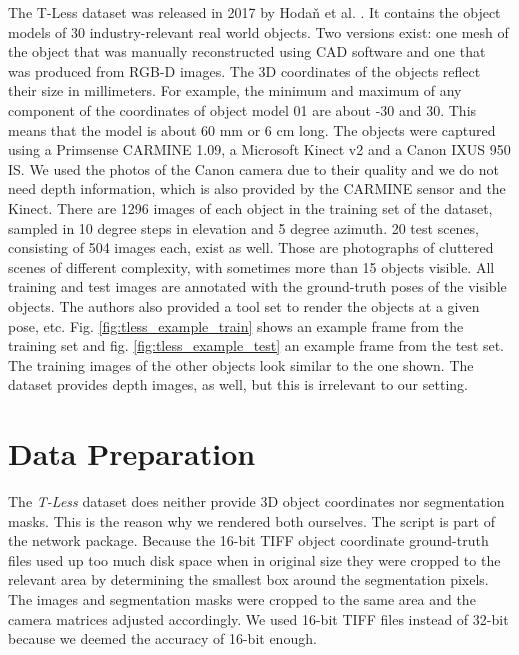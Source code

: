 The T-Less dataset was released in 2017 by Hoda\v{n} et al. \cite{tless}. It contains the object models of 30 industry-relevant real world objects. Two versions exist: one mesh of the object that was manually reconstructed using CAD software and one that was produced from RGB-D images. The 3D coordinates of the objects reflect their size in millimeters. For example, the minimum and maximum of any component of the coordinates of object model 01 are about -30 and 30. This means that the model is about 60 mm or 6 cm long. The objects were captured using a Primsense CARMINE 1.09, a Microsoft Kinect v2 and a Canon IXUS 950 IS. We used the photos of the Canon camera due to their quality and we do not need depth information, which is also provided by the CARMINE sensor and the Kinect. There are 1296 images of each object in the training set of the dataset, sampled in 10 degree steps in elevation and 5 degree azimuth. 20 test scenes, consisting of 504 images each, exist as well. Those are photographs of cluttered scenes of different complexity, with sometimes more than 15 objects visible. All training and test images are annotated with the ground-truth poses of the visible objects. The authors also provided a tool set to render the objects at a given pose, etc. Fig. \ref{fig:tless_example_train} shows an example frame from the training set and fig. \ref{fig:tless_example_test} an example frame from the test set. The training images of the other objects look similar to the one shown. The dataset provides depth images, as well, but this is irrelevant to our setting.


\section{Data Preparation}

The \textit{T-Less} dataset does neither provide 3D object coordinates nor segmentation masks. This is the reason why we rendered both ourselves. The script is part of the network package. Because the 16-bit TIFF object coordinate ground-truth files used up too much disk space when in original size they were cropped to the relevant area by determining the smallest box around the segmentation pixels. The images and segmentation masks were cropped to the same area and the camera matrices adjusted accordingly. We used 16-bit TIFF files instead of 32-bit because we deemed the accuracy of 16-bit enough.


